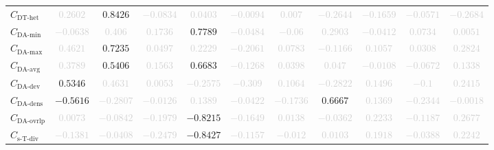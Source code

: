 \documentclass{standalone}
\newcommand{\dthetname}{\text{DT-het}}
\newcommand{\dthet}{C_{\dthetname}}
\newcommand{\daminname}{\text{DA-min}}
\newcommand{\damin}{C_{\daminname}}
\newcommand{\daavgname}{\text{DA-avg}}
\newcommand{\daavg}{C_{\daavgname}}
\newcommand{\damaxname}{\text{DA-max}}
\newcommand{\damax}{C_{\damaxname}}
\newcommand{\dadevname}{\text{DA-dev}}
\newcommand{\dadev}{C_{\dadevname}}
\newcommand{\dadensname}{\text{DA-dens}}
\newcommand{\dadens}{C_{\dadensname}}
\newcommand{\daoverlapname}{\text{DA-ovrlp}}
\newcommand{\daoverlap}{C_{\daoverlapname}}
\newcommand{\simpletracedivname}{\text{s-T-div}}
\newcommand{\simpletracediv}{C_{\simpletracedivname}}
\begin{document}
\begin{tabular}{lcccccccccc}
$\dthet$ & \textcolor{lightgray}{$0.2602$} & $0.8426$ & \textcolor{lightgray}{$-0.0834$} & \textcolor{lightgray}{$0.0403$} & \textcolor{lightgray}{$-0.0094$} & \textcolor{lightgray}{$0.007$} & \textcolor{lightgray}{$-0.2644$} & \textcolor{lightgray}{$-0.1659$} & \textcolor{lightgray}{$-0.0571$} & \textcolor{lightgray}{$-0.2684$} \\ 
$\damin$ & \textcolor{lightgray}{$-0.0638$} & \textcolor{lightgray}{$0.406$} & \textcolor{lightgray}{$0.1736$} & $0.7789$ & \textcolor{lightgray}{$-0.0484$} & \textcolor{lightgray}{$-0.06$} & \textcolor{lightgray}{$0.2903$} & \textcolor{lightgray}{$-0.0412$} & \textcolor{lightgray}{$0.0734$} & \textcolor{lightgray}{$0.0051$} \\ 
$\damax$ & \textcolor{lightgray}{$0.4621$} & $0.7235$ & \textcolor{lightgray}{$0.0497$} & \textcolor{lightgray}{$0.2229$} & \textcolor{lightgray}{$-0.2061$} & \textcolor{lightgray}{$0.0783$} & \textcolor{lightgray}{$-0.1166$} & \textcolor{lightgray}{$0.1057$} & \textcolor{lightgray}{$0.0308$} & \textcolor{lightgray}{$0.2824$} \\ 
$\daavg$ & \textcolor{lightgray}{$0.3789$} & $0.5406$ & \textcolor{lightgray}{$0.1563$} & $0.6683$ & \textcolor{lightgray}{$-0.1268$} & \textcolor{lightgray}{$0.0398$} & \textcolor{lightgray}{$0.047$} & \textcolor{lightgray}{$-0.0108$} & \textcolor{lightgray}{$-0.0672$} & \textcolor{lightgray}{$0.1338$} \\ 
$\dadev$ & $0.5346$ & \textcolor{lightgray}{$0.4631$} & \textcolor{lightgray}{$0.0053$} & \textcolor{lightgray}{$-0.2575$} & \textcolor{lightgray}{$-0.309$} & \textcolor{lightgray}{$0.1064$} & \textcolor{lightgray}{$-0.2822$} & \textcolor{lightgray}{$0.1496$} & \textcolor{lightgray}{$-0.1$} & \textcolor{lightgray}{$0.2415$} \\ 
$\dadens$ & $-0.5616$ & \textcolor{lightgray}{$-0.2807$} & \textcolor{lightgray}{$-0.0126$} & \textcolor{lightgray}{$0.1389$} & \textcolor{lightgray}{$-0.0422$} & \textcolor{lightgray}{$-0.1736$} & $0.6667$ & \textcolor{lightgray}{$0.1369$} & \textcolor{lightgray}{$-0.2344$} & \textcolor{lightgray}{$-0.0018$} \\ 
$\daoverlap$ & \textcolor{lightgray}{$0.0073$} & \textcolor{lightgray}{$-0.0842$} & \textcolor{lightgray}{$-0.1979$} & $-0.8215$ & \textcolor{lightgray}{$-0.1649$} & \textcolor{lightgray}{$0.0138$} & \textcolor{lightgray}{$-0.0362$} & \textcolor{lightgray}{$0.2233$} & \textcolor{lightgray}{$-0.1187$} & \textcolor{lightgray}{$0.2677$} \\ 
$\simpletracediv$ & \textcolor{lightgray}{$-0.1381$} & \textcolor{lightgray}{$-0.0408$} & \textcolor{lightgray}{$-0.2479$} & $-0.8427$ & \textcolor{lightgray}{$-0.1157$} & \textcolor{lightgray}{$-0.012$} & \textcolor{lightgray}{$0.0103$} & \textcolor{lightgray}{$0.1918$} & \textcolor{lightgray}{$-0.0388$} & \textcolor{lightgray}{$0.2242$} \\ 

\end{tabular}
\end{document}
